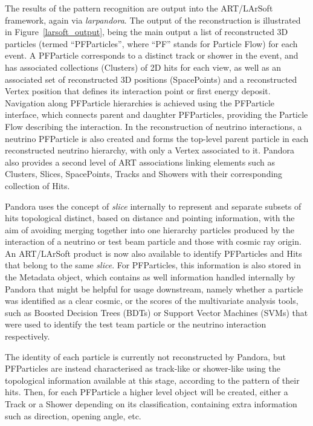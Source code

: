The results of the pattern recognition are output into the ART/LArSoft framework, again via {\it larpandora}. The output of the reconstruction is illustrated in Figure~\ref{larsoft_output}, being the main output a list of reconstructed 3D particles (termed ``PFParticles'', where ``PF'' stands for Particle Flow) for each event. A PFParticle corresponds to a distinct track or shower in the event, and has associated collections (Clusters) of 2D hits for each view, as well as an associated set of reconstructed 3D positions (SpacePoints) and a reconstructed Vertex position that defines its interaction point or first energy deposit. Navigation along PFParticle hierarchies is achieved using the PFParticle interface, which connects parent and daughter PFParticles, providing the Particle Flow describing the interaction. In the reconstruction of neutrino interactions, a neutrino PFParticle is also created and forms the top-level parent particle in each reconstructed neutrino hierarchy, with only a Vertex associated to it. Pandora also provides a second level of ART associations linking elements such as Clusters, Slices, SpacePoints, Tracks and Showers with their corresponding collection of Hits. 

Pandora uses the concept of {\it slice} internally to represent and separate subsets of hits topological distinct, based on distance and pointing information, with the aim of avoiding merging together into one hierarchy particles produced by the interaction of a neutrino or test beam particle and those with cosmic ray origin. An ART/LArSoft product is now also available to identify PFParticles and Hits that belong to the same {\it slice}. For PFParticles, this information is also stored in the Metadata object, which contains as well information handled internally by Pandora that might be helpful for usage downstream, namely whether a particle was identified as a clear cosmic, or the scores of the multivariate analysis tools, such as Boosted Decision Trees (BDTs) or Support Vector Machines (SVMs) that were used to identify the test team particle or the neutrino interaction respectively. 

The identity of each particle is currently not reconstructed by Pandora, but PFParticles are instead characterised as track-like or shower-like using the topological information available at this stage, according to the pattern of their hits. Then, for each PFParticle a higher level object will be created, either a Track or a Shower depending on its classification, containing extra information such as direction, opening angle, etc.  

